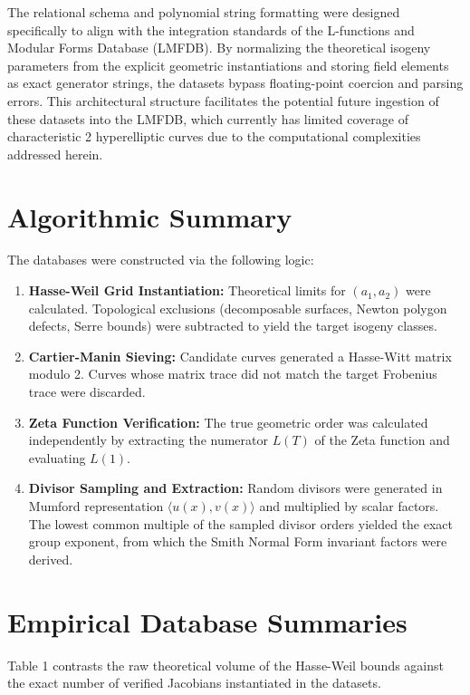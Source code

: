 \documentclass[12pt, letterpaper]{article}
\begin{document}
The relational schema and polynomial string formatting were designed specifically to align with the integration standards of the L-functions and Modular Forms Database (LMFDB). By normalizing the theoretical isogeny parameters from the explicit geometric instantiations and storing field elements as exact generator strings, the datasets bypass floating-point coercion and parsing errors. This architectural structure facilitates the potential future ingestion of these datasets into the LMFDB, which currently has limited coverage of characteristic 2 hyperelliptic curves due to the computational complexities addressed herein.

\section{Algorithmic Summary}
The databases were constructed via the following logic:
\begin{enumerate}
    \item \textbf{Hasse-Weil Grid Instantiation:} Theoretical limits for $(a_1, a_2)$ were calculated. Topological exclusions (decomposable surfaces, Newton polygon defects, Serre bounds) were subtracted to yield the target isogeny classes.
    \item \textbf{Cartier-Manin Sieving:} Candidate curves generated a Hasse-Witt matrix modulo 2. Curves whose matrix trace did not match the target Frobenius trace were discarded.
    \item \textbf{Zeta Function Verification:} The true geometric order was calculated independently by extracting the numerator $L(T)$ of the Zeta function and evaluating $L(1)$. 
    \item \textbf{Divisor Sampling and Extraction:} Random divisors were generated in Mumford representation $\langle u(x), v(x) \rangle$ and multiplied by scalar factors. The lowest common multiple of the sampled divisor orders yielded the exact group exponent, from which the Smith Normal Form invariant factors were derived. 
\end{enumerate}

\section{Empirical Database Summaries}
Table 1 contrasts the raw theoretical volume of the Hasse-Weil bounds against the exact number of verified Jacobians instantiated in the datasets.
\end{document}
